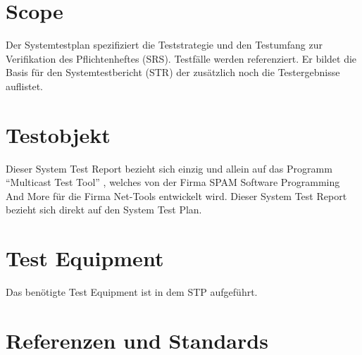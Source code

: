 
\chapter{Scope}
Der Systemtestplan spezifiziert die Teststrategie und den Testumfang zur
Verifikation des Pflichtenheftes (SRS). Testfälle werden referenziert.
Er bildet die Basis für den Systemtestbericht (STR) der zusätzlich noch die
Testergebnisse auflistet.


\chapter{Testobjekt}
Dieser System Test Report bezieht sich einzig und allein auf das Programm "`Multicast Test Tool"'
, welches von der Firma SPAM Software Programming And More für die Firma Net-Tools entwickelt wird.
Dieser System Test Report bezieht sich direkt auf den System Test Plan.

\chapter{Test Equipment}
Das benötigte Test Equipment ist in dem STP aufgeführt.









\chapter{Referenzen und Standards}
